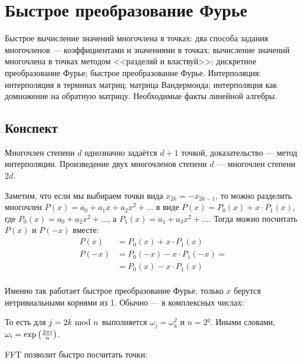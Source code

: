 \section{Быстрое преобразование Фурье}
Быстрое вычисление значений многочлена в точках:
два способа задания многочленов
--- коэффициентами и значениями в точках;
вычисление значений многочлена в точках методом
<<разделяй и властвуй>>;
дискретное преобразование Фурье;
быстрое преобразование Фурье.
Интерполяция: интерполяция в терминах матриц;
матрица Вандермонда;
интерполяция как домножение на обратную матрицу.
Необходимые факты линейной алгебры.

\subsection{Конспект}
Многочлен степени $d$ однозначно задаётся $d + 1$ точкой,
доказательство --- метод интерполяции.
Произведение двух многочленов степени $d$ ---
многочлен степени $2d$.

Заметим, что если мы выбираем точки вида
$x_{2k} = -x_{2k - 1}$,
то можно разделить многочлен
$P(x) = a_0 + a_1 x + a_2 x^2 + \ldots$
в виде $P(x) = P_0(x) + x \cdot P_1(x)$,
где $P_0(x) = a_0 + a_2 x^2 + \ldots$,
а $P_1(x) = a_1 + a_3 x^2 + \ldots$.
Тогда можно посчитать $P(x)$ и $P(-x)$ вместе:
\begin{align*}
    P(x) & = P_0(x) + x \cdot P_1(x) \\
    P(-x) & = P_0(-x) - x \cdot P_1(-x) = \\
    & = P_0(x) - x \cdot P_1(x) \\
\end{align*}

Именно так работает быстрое преобразование Фурье,
только $x$ берутся нетривиальными корнями из 1.
Обычно --- в комплексных числах:
\begin{center}
\end{center}

То есть для $j = 2k ~\text{mod}~ n$
выполняется $\omega_j = \omega_k^2$
и $n = 2^q$.
Иными словами,
$\omega_i = \exp \left( \frac{2 \pi i}{n} \right)$.

FFT позволит быстро посчитать точки:

